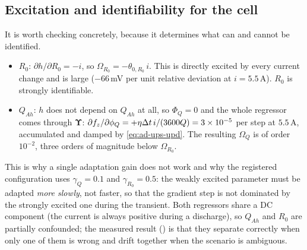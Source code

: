 \subsection{Excitation and identifiability for the cell}
\label{sec:ad-pe}
It is worth checking  concretely, because it determines what can and cannot be
identified.
\begin{itemize}[nosep]
\item $R_0$: $\partial h/\partial R_0 = -i$, so $\Omega_{R_0} = -\theta_{0,R_0}\,i$.  This is
directly excited by every current change and is large ($-66$\,mV per unit relative deviation at
$i = 5.5$\,A).  $R_0$ is strongly identifiable.
\item $Q_{Ah}$: $h$ does not depend on $Q_{Ah}$ at all, so $\Phi_{Q}=0$ and the whole regressor
comes through $\bm{\Upsilon}$: $\partial f_{z}/\partial\phi_Q = +\eta\Delta t\,i/(3600Q) =
3\times10^{-5}$ per step at $5.5$\,A, accumulated and damped by \eqref{eq:ad-ups-upd}.  The
resulting $\Omega_Q$ is of order $10^{-2}$, three orders of magnitude below $\Omega_{R_0}$.
\end{itemize}
This is why a single adaptation gain does not work and why the registered configuration uses
$\gamma_{Q} = 0.1$ and $\gamma_{R_0} = 0.5$: the weakly excited parameter must be adapted
\emph{more slowly}, not faster, so that the gradient step is not dominated by the strongly excited
one during the transient.  Both regressors share a DC component (the current is always positive
during a discharge), so $Q_{Ah}$ and $R_0$ are partially confounded; the measured result
() is that they separate correctly when only one of them is wrong and drift
together when the scenario is ambiguous.

